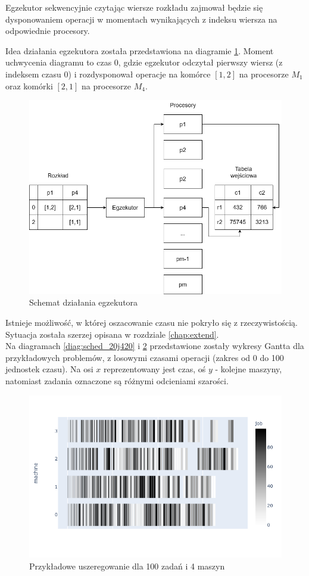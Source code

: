 \documentclass[brudnopis]{xmgr}
\begin{document}
Egzekutor sekwencyjnie czytając wiersze rozkładu zajmował będzie się dysponowaniem operacji w momentach wynikających z indeksu wiersza na odpowiednie procesory.
\medskip

Idea działania egzekutora została przedstawiona na diagramie \ref{diag:executor}. Moment uchwycenia diagramu 
to czas 0, gdzie egzekutor odczytał pierwszy wiersz (z indeksem czasu 0) i rozdysponował operacje na komórce $[1,2]$ na procesorze $M_1$ oraz komórki $[2,1]$ na procesorze $M_4$.
\medskip

\begin{figure}[!tbh]
\centering
\includegraphics[width=.8\hsize]{fig/executor.png}
\caption{Schemat działania egzekutora\label{diag:executor}}
\end{figure}
\medskip

Istnieje możliwość, w której oszacowanie czasu nie pokryło się z rzeczywistością. Sytuacja została szerzej opisana w rozdziale \ref{chap:extend}.\\

Na diagramach \ref{diag:sched_20j420} i \ref{diag:sched_100j4m} przedstawione zostały wykresy Gantta dla przykładowych problemów, z losowymi czasami operacji (zakres od 0 do 100 jednostek czasu). Na osi $x$ reprezentowany jest czas, oś $y$ - kolejne maszyny, natomiast zadania oznaczone są różnymi odcieniami szarości.

\begin{figure}[!tbh]
\centering
\includegraphics[width=.8\hsize]{fig/newplot_trim100j4m.png}
\caption{Przykładowe uszeregowanie dla 100 zadań i 4 maszyn\label{diag:sched_100j4m}}
\end{figure}
\medskip
\end{document}
